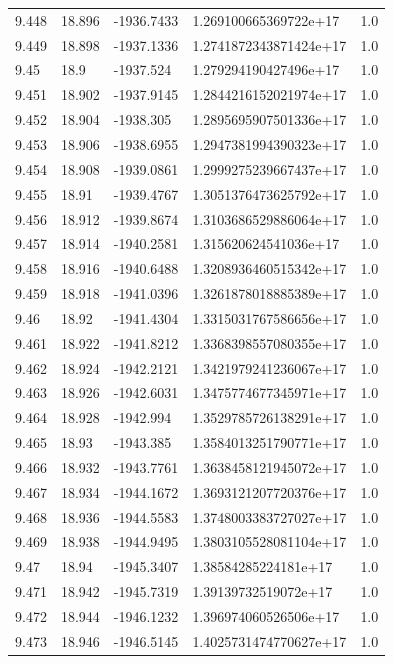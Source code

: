 \begin{tabular}{lllll}
9.448 & 18.896 & -1936.7433 & 1.269100665369722e+17 & 1.0 \\
9.449 & 18.898 & -1937.1336 & 1.2741872343871424e+17 & 1.0 \\
9.45 & 18.9 & -1937.524 & 1.279294190427496e+17 & 1.0 \\
9.451 & 18.902 & -1937.9145 & 1.2844216152021974e+17 & 1.0 \\
9.452 & 18.904 & -1938.305 & 1.2895695907501336e+17 & 1.0 \\
9.453 & 18.906 & -1938.6955 & 1.2947381994390323e+17 & 1.0 \\
9.454 & 18.908 & -1939.0861 & 1.2999275239667437e+17 & 1.0 \\
9.455 & 18.91 & -1939.4767 & 1.3051376473625792e+17 & 1.0 \\
9.456 & 18.912 & -1939.8674 & 1.3103686529886064e+17 & 1.0 \\
9.457 & 18.914 & -1940.2581 & 1.315620624541036e+17 & 1.0 \\
9.458 & 18.916 & -1940.6488 & 1.3208936460515342e+17 & 1.0 \\
9.459 & 18.918 & -1941.0396 & 1.3261878018885389e+17 & 1.0 \\
9.46 & 18.92 & -1941.4304 & 1.3315031767586656e+17 & 1.0 \\
9.461 & 18.922 & -1941.8212 & 1.3368398557080355e+17 & 1.0 \\
9.462 & 18.924 & -1942.2121 & 1.3421979241236067e+17 & 1.0 \\
9.463 & 18.926 & -1942.6031 & 1.3475774677345971e+17 & 1.0 \\
9.464 & 18.928 & -1942.994 & 1.3529785726138291e+17 & 1.0 \\
9.465 & 18.93 & -1943.385 & 1.3584013251790771e+17 & 1.0 \\
9.466 & 18.932 & -1943.7761 & 1.3638458121945072e+17 & 1.0 \\
9.467 & 18.934 & -1944.1672 & 1.3693121207720376e+17 & 1.0 \\
9.468 & 18.936 & -1944.5583 & 1.3748003383727027e+17 & 1.0 \\
9.469 & 18.938 & -1944.9495 & 1.3803105528081104e+17 & 1.0 \\
9.47 & 18.94 & -1945.3407 & 1.38584285224181e+17 & 1.0 \\
9.471 & 18.942 & -1945.7319 & 1.39139732519072e+17 & 1.0 \\
9.472 & 18.944 & -1946.1232 & 1.396974060526506e+17 & 1.0 \\
9.473 & 18.946 & -1946.5145 & 1.4025731474770627e+17 & 1.0 \\

\end{tabular}
